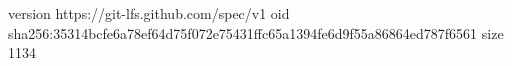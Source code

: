 version https://git-lfs.github.com/spec/v1
oid sha256:35314bcfe6a78ef64d75f072e75431ffc65a1394fe6d9f55a86864ed787f6561
size 1134
